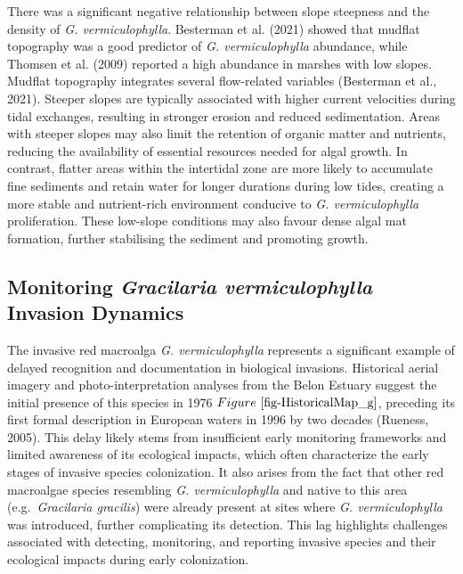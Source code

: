 \documentclass[
  letterpaper,
  11pt,
  english,
  singlespacing,
  headsepline]{MastersDoctoralThesis}
\begin{document}
\begin{spacing}{1.5}
There was a significant negative relationship between slope steepness
and the density of \emph{G. vermiculophylla}. Besterman et al. (2021)
showed that mudflat topography was a good predictor of \emph{G.
vermiculophylla} abundance, while Thomsen et al. (2009) reported a high
abundance in marshes with low slopes. Mudflat topography integrates
several flow-related variables (Besterman et al., 2021). Steeper slopes
are typically associated with higher current velocities during tidal
exchanges, resulting in stronger erosion and reduced sedimentation.
Areas with steeper slopes may also limit the retention of organic matter
and nutrients, reducing the availability of essential resources needed
for algal growth. In contrast, flatter areas within the intertidal zone
are more likely to accumulate fine sediments and retain water for longer
durations during low tides, creating a more stable and nutrient-rich
environment conducive to \emph{G. vermiculophylla} proliferation. These
low-slope conditions may also favour dense algal mat formation, further
stabilising the sediment and promoting growth.

\subsection{\texorpdfstring{Monitoring \emph{Gracilaria vermiculophylla}
Invasion
Dynamics}{Monitoring Gracilaria vermiculophylla Invasion Dynamics}}\label{monitoring-gracilaria-vermiculophylla-invasion-dynamics}

The invasive red macroalga \emph{G. vermiculophylla} represents a
significant example of delayed recognition and documentation in
biological invasions. Historical aerial imagery and photo-interpretation
analyses from the Belon Estuary suggest the initial presence of this
species in 1976 \(Figure~\ref{fig-HistoricalMap_g}\), preceding its
first formal description in European waters in 1996 by two decades
(Rueness, 2005). This delay likely stems from insufficient early
monitoring frameworks and limited awareness of its ecological impacts,
which often characterize the early stages of invasive species
colonization. It also arises from the fact that other red macroalgae
species resembling \emph{G. vermiculophylla} and native to this area
(e.g.~\emph{Gracilaria gracilis}) were already present at sites where
\emph{G. vermiculophylla} was introduced, further complicating its
detection. This lag highlights challenges associated with detecting,
monitoring, and reporting invasive species and their ecological impacts
during early colonization.


\end{spacing}
\end{document}
